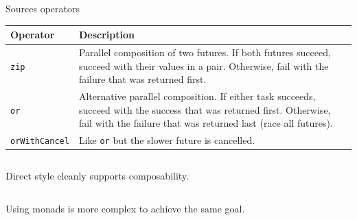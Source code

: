 \documentclass[aspectratio=1610,xcolor=dvipsnames,handout]{beamer}
\begin{document}
%
\begin{frame}{Sources operators}
  \small
  \begin{table}
    \centering
    \renewcommand{\arraystretch}{1.5}
    \begin{tabular}{ | m{4cm} | m{9cm} | } 
      \hline
      \textbf{Operator} & \textbf{Description} \\
      \hline
      \hline
      \texttt{zip} & Parallel composition of two futures. If both futures succeed, succeed with their values in a pair. Otherwise, fail with the failure that was returned first. \\ 
      \hline
      \texttt{or} & Alternative parallel composition. If either task succeeds, succeed with the success that was returned first. Otherwise, fail with the failure that was returned last (race all futures). \\
      \hline
      \texttt{orWithCancel} & Like \texttt{or} but the slower future is cancelled. \\ 
      \hline
    \end{tabular}
  \end{table}
\end{frame}
%
\begin{frame}
  \small
  \begin{columns}
      
      Direct style cleanly supports composability.
  \end{columns}
  
  \pause
  \begin{columns}
      
      
      Using monads is more complex to achieve the same goal.
  \end{columns}
\end{frame}
%
\end{document}

